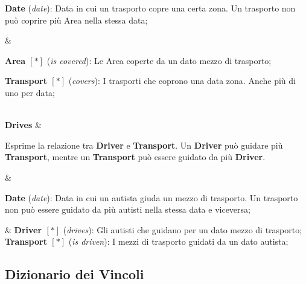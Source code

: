 {{  \textbf{Date} (\textit{date}): Data in cui un trasporto copre una certa zona. Un trasporto non può coprire più Area nella stessa data; 
  
  } &
  {\footnotesize
  \textbf{Area \([*]\)} (\textit{is covered}): Le Area coperte da un dato mezzo di trasporto;

  \textbf{Transport \([*]\)} (\textit{covers}): I trasporti che coprono una data zona. Anche più di uno per data;
  }\\

  \textbf{Drives} &
  {\footnotesize
  Esprime la relazione tra \textbf{Driver} e \textbf{Transport}. Un \textbf{Driver} può guidare più \textbf{Transport}, mentre un \textbf{Transport} può essere guidato da più \textbf{Driver}.
  
  } &
  {\footnotesize

  \textbf{Date} (\textit{date}): Data in cui un autista giuda un mezzo di trasporto. Un trasporto non può essere guidato da più autisti nella stessa data e viceversa; 
  
  } &
  {\footnotesize
  \textbf{Driver \([*]\)} (\textit{drives}): Gli autisti che guidano per un dato mezzo di trasporto; 
  \textbf{Transport \([*]\)} (\textit{is driven}): I mezzi di trasporto guidati da un dato autista;
  }\\
}

\subsection{Dizionario dei Vincoli}

